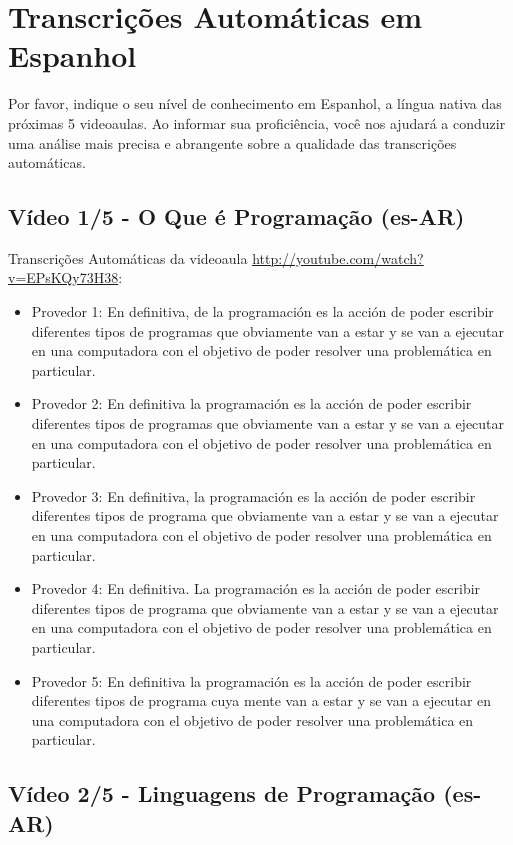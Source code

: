 \section{Transcrições Automáticas em Espanhol}

Por favor, indique o seu nível de conhecimento em Espanhol, a língua nativa das próximas 
5 videoaulas. Ao informar sua proficiência, você nos ajudará a conduzir uma análise mais 
precisa e abrangente sobre a qualidade das transcrições automáticas.

\subsection{Vídeo 1/5 - O Que é Programação (es-AR)}

\noindent
Transcrições Automáticas da videoaula \url{http://youtube.com/watch?v=EPsKQy73H38}:

\begin{itemize}
    \item Provedor 1: En definitiva, de la programación es la acción de poder escribir diferentes tipos de programas que obviamente van a estar y se van a ejecutar en una computadora con el objetivo de poder resolver una problemática en particular.
    \item Provedor 2: En definitiva la programación es la acción de poder escribir diferentes tipos de programas que obviamente van a estar y se van a ejecutar en una computadora con el objetivo de poder resolver una problemática en particular.
    \item Provedor 3: En definitiva, la programación es la acción de poder escribir diferentes tipos de programa que obviamente van a estar y se van a ejecutar en una computadora con el objetivo de poder resolver una problemática en particular.
    \item Provedor 4: En definitiva. La programación es la acción de poder escribir diferentes tipos de programa que obviamente van a estar y se van a ejecutar en una computadora con el objetivo de poder resolver una problemática en particular.
    \item Provedor 5: En definitiva la programación es la acción de poder escribir diferentes tipos de programa cuya mente van a estar y se van a ejecutar en una computadora con el objetivo de poder resolver una problemática en particular.
\end{itemize}

\subsection{Vídeo 2/5 - Linguagens de Programação (es-AR)}

